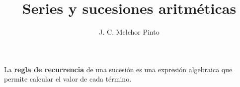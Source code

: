 \documentclass[12pt]{guia}
\title{Series y sucesiones aritméticas}
\author{J. C. Melchor Pinto}
\begin{document}
\pagestyle{headandfoot}
\addpoints
\INFO
\begin{multicols}{2}
    
    
    
    
\end{multicols}
\newpage
\begin{questions}
    
    \begin{importantbox}
        La \textbf{regla de recurrencia} de una sucesión es una expresión algebraica que permite calcular el valor de cada término.
    \end{importantbox}
    
    
    \newpage
    
    
    \newpage
    
    \newpage
    
    
    \newpage
    
    
    
    \newpage
    
    

\end{questions}
\end{document}
